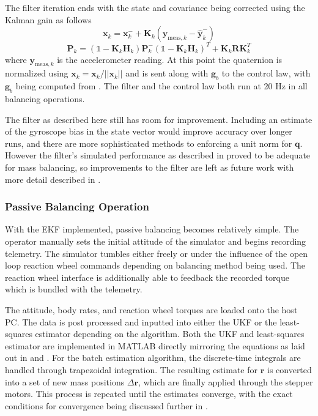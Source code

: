 The filter iteration ends with the state and covariance being corrected using the Kalman gain as follows
\begin{equation}
    \bm{x}_k = \bm{x}_k^- + \bm{K}_k(\bm{y}_{\text{meas},k}-\hat{\bm{y}}_k^-)
\end{equation}
\begin{equation}
    \bm{P}_k = (\mathbb{1} - \bm{K}_k\bm{H}_k)\bm{P}_k^-(\mathbb{1} - \bm{K}_k\bm{H}_k)^T
    + \bm{K}_k\bm{R}\bm{K}_k^T
\end{equation}
where $\bm{y}_{\text{meas},k}$ is the accelerometer reading. At this point the quaternion is normalized using $\bm{x}_k = \bm{x}_k / ||\bm{x}_k||$ and is sent along with $\bm{g}_b$ to the control law, with $\bm{g}_b$ being computed from . The filter and the control law both run at 20 Hz in all balancing operations.

The filter as described here still has room for improvement. Including an estimate of the gyroscope bias in the state vector would improve accuracy over longer runs, and there are more sophisticated methods to enforcing a unit norm for $\bm{q}$. However the filter's simulated performance as described in  proved to be adequate for mass balancing, so improvements to the filter are left as future work with more detail described in .

\subsubsection{Passive Balancing Operation}

With the EKF implemented, passive balancing becomes relatively simple. The operator manually sets the initial attitude of the simulator and begins recording telemetry. The simulator tumbles either freely or under the influence of the open loop reaction wheel commands depending on balancing method being used. The reaction wheel interface is additionally able to feedback the recorded torque which is bundled with the telemetry. 

The attitude, body rates, and reaction wheel torques are loaded onto the host PC. The data is post processed and inputted into either the UKF or the least-squares estimator depending on the algorithm. Both the UKF and least-squares estimator are implemented in MATLAB directly mirroring the equations as laid out in  and . For the batch estimation algorithm, the discrete-time integrals are handled through trapezoidal integration. The resulting estimate for $\bm{r}$ is converted into a set of new mass positions $\Delta\bm{r}$, which are finally applied through the stepper motors. This process is repeated until the estimates converge, with the exact conditions for convergence being discussed further in . 

